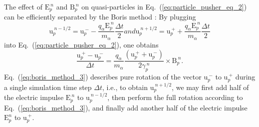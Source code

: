 \documentclass[10pt, a4paper, twoside, openright]{report}
\renewcommand{\vec}[1]{\boldsymbol{\mathrm{#1}}}
\begin{document}
The effect of $ \vec{E}_{p}^{\:n} $ and $ \vec{B}_{p}^{\:n} $ on quasi-particles in Eq.~(\ref{eq:particle_pusher_eq_2}) can be efficiently separated by the Boris method \cite{Boris1970}: By plugging
\begin{subequations}
\begin{equation}\label{eq:boris_method_1}
	\vec{u}_{p}^{\:n-1/2} = \vec{u}_{p}^{\:-} - \frac{q_{\alpha} \vec{E}_{p}^{\:n}}{m_{\alpha}} \frac{\Delta t}{2}
\end{equation}
and
\begin{equation}\label{eq:boris_method_2}
	\vec{u}_{p}^{\:n+1/2} = \vec{u}_{p}^{\:+} + \frac{q_{\alpha} \vec{E}_{p}^{\:n}}{m_{\alpha}} \frac{\Delta t}{2}
\end{equation}
\end{subequations}
into Eq.~(\ref{eq:particle_pusher_eq_2}), one obtains
\begin{equation}\label{eq:boris_method_3}
	\frac{\vec{u}_{p}^{\:+} - \vec{u}_{p}^{\:-}}{\Delta t} = \frac{q_{\alpha}}{m_{\alpha}} \frac{\left( \vec{u}_{p}^{\:+} + \vec{u}_{p}^{\:-} \right)}{2 \gamma_p^{\:n} } \times \vec{B}_{p}^{\:n}. 
\end{equation}
Eq.~(\ref{eq:boris_method_3}) describes pure rotation of the vector $ \vec{u}_{p}^{\:-} $ to $ \vec{u}_{p}^{\:+} $ during a single simulation time step $ \Delta t $, i.e., to obtain $ \vec{u}_{p}^{\:n+1/2} $, we may first add half of the electric impulse $ \vec{E}_{p}^{\:n} $ to $ \vec{u}_{p}^{\:n-1/2} $, then perform the full rotation according to Eq.~(\ref{eq:boris_method_3}), and finally add another half of the electric impulse $ \vec{E}_{p}^{n} $ to $ \vec{u}_{p}^{\:+} $.
\end{document}
